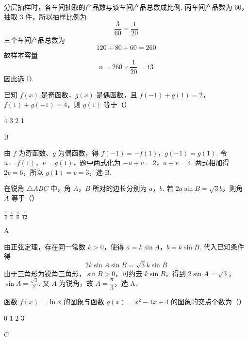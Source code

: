 \begin{solution}
分层抽样时，各车间抽取的产品数与该车间产品总数成比例. 丙车间产品数为 \(60\)，抽取 \(3\) 件，所以抽样比例为
\[
\frac{3}{60}=\frac{1}{20}
\]
三个车间产品总数为
\[
120+80+60=260
\]
故样本容量
\[
n=260\times\frac{1}{20}=13
\]
因此选 D.
\end{solution}

\begin{problem}
已知 \( f(x) \) 是奇函数，\( g(x) \) 是偶函数，且 \( f(-1)+g(1)=2 \)，\( f(1)+g(-1)=4 \)，则 \( g(1) \) 等于（\quad）

\choices
    {4}
    {3}
    {2}
    {1}
\end{problem}

\begin{answer}
B
\end{answer}

\begin{solution}
由 \(f\) 为奇函数、\(g\) 为偶函数，得
\(f(-1)=-f(1)\)，\(g(-1)=g(1)\).
令 \(u=f(1)\)，\(v=g(1)\)，题中两式化为
\(-u+v=2\)，\(u+v=4\).
两式相加得 \(2v=6\)，所以 \(g(1)=v=3\)，选 B.
\end{solution}

\begin{problem}
在锐角 \(\triangle ABC\) 中，角 \(A\)，\(B\) 所对的边长分别为 \(a\)，\(b\). 若 \(2a \sin B = \sqrt{3} b\)，则角 \(A\) 等于（\quad）

\choices
    {\( \frac{\pi}{3} \)}
    {\( \frac{\pi}{4} \)}
    {\( \frac{\pi}{6} \)}
    {\( \frac{\pi}{12} \)}
\end{problem}

\begin{answer}
A
\end{answer}

\begin{solution}
由正弦定理，存在同一常数 \(k>0\)，使得
\(a=k\sin A\)，\(b=k\sin B\).
代入已知条件得
\[
2k\sin A\sin B=\sqrt{3}k\sin B
\]
由于三角形为锐角三角形，\(\sin B>0\)，可约去 \(k\sin B\)，得到
\(2\sin A=\sqrt{3}\)，\(\sin A=\frac{\sqrt{3}}{2}\).
又 \(A\) 为锐角，故 \(A=\dfrac{\pi}{3}\)，选 A.
\end{solution}

\begin{problem}
函数 \( f(x) = \ln x \) 的图象与函数 \( g(x) = x^2 - 4x + 4 \) 的图象的交点个数为（\quad）

\choices
    {0}
    {1}
    {2}
    {3}
\end{problem}

\begin{answer}
C
\end{answer}


